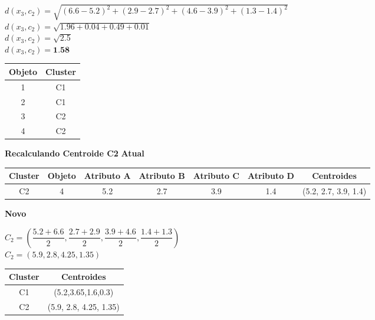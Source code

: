 \documentclass{article}
\begin{document}
  \begin{center}
    $d(x_3,c_2) = \sqrt{(6.6-5.2)^2 + (2.9-2.7)^2 + (4.6-3.9)^2 +(1.3-1.4)^2}$  \\
    $d(x_3,c_2) = \sqrt{1.96 + 0.04 + 0.49 + 0.01}$ \\
    $d(x_3,c_2) = \sqrt{2.5}$ \\
    $d(x_3,c_2) = \textbf{1.58}$
  \end{center}

  \begin{table}[H]
    \centering
    \begin{tabular}{|c|c|}
    \hline
    \rowcolor[HTML]{EFEFEF} 
    \textbf{Objeto} & \textbf{Cluster} \\ \hline
    1               & C1               \\ \hline
    2               & C1               \\ \hline
    3               & C2               \\ \hline
    4               & C2               \\ \hline
    \end{tabular}
  \end{table}

  \textbf{Recalculando Centroide C2}
  \textbf{Atual}
  \begin{table}[H]
    \centering
    \begin{tabular}{|c|c|c|c|c|c|c|}
    \hline
    \rowcolor[HTML]{EFEFEF} 
    \textbf{Cluster} & \textbf{Objeto} & \textbf{Atributo A} & \textbf{Atributo B} & \textbf{Atributo C} & \textbf{Atributo D} & \textbf{Centroides}  \\ \hline
    C2               & 4               & 5.2                 & 2.7                 & 3.9                 & 1.4                 & (5.2, 2.7, 3.9, 1.4) \\ \hline
    \end{tabular}
  \end{table}
  \textbf{Novo}

  \begin{center}
    $C_2 = (\dfrac{5.2 + 6.6}{2}, \dfrac{2.7+2.9}{2}, \dfrac{3.9 + 4.6}{2}, \dfrac{1.4 + 1.3}{2} )$ \\
    $C_2 = (5.9, 2.8, 4.25, 1.35)$
  \end{center}

  \begin{table}[H]
    \centering
    \begin{tabular}{|c|c|}
    \hline
    \rowcolor[HTML]{EFEFEF} 
    \textbf{Cluster} & \textbf{Centroides}  \\ \hline
    C1               & (5.2,3.65,1.6,0.3)   \\ \hline
    C2               & (5.9, 2.8, 4.25, 1.35) \\ \hline
    \end{tabular}
  \end{table}
\end{document}
